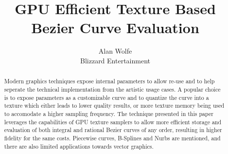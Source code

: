 \documentclass{jcgt}
\begin{document}
\usetikzlibrary{arrows.meta}

\title{GPU Efficient Texture Based Bezier Curve Evaluation}

\author
       {Alan Wolfe\\Blizzard Entertainment}


\maketitle
\thispagestyle{firstpagestyle}

\begin{abstract}
\small
Modern graphics techniques expose internal parameters to allow re-use and to help seperate the technical implementation from the artistic usage cases.  A popular choice is to expose parameters as a customizable curve and to quantize the curve into a texture which either leads to lower quality results, or more texture memory being used to accomodate a higher sampling frequency.  The technique presented in this paper leverages the capabilities of GPU texture samplers to allow more efficient storage and evaluation of both integral and rational Bezier curves of any order, resulting in higher fidelity for the same costs.  Piecewise curves, B-Splines and Nurbs are mentioned, and there are also limited applications towards vector graphics.
\end{abstract}
\end{document}

